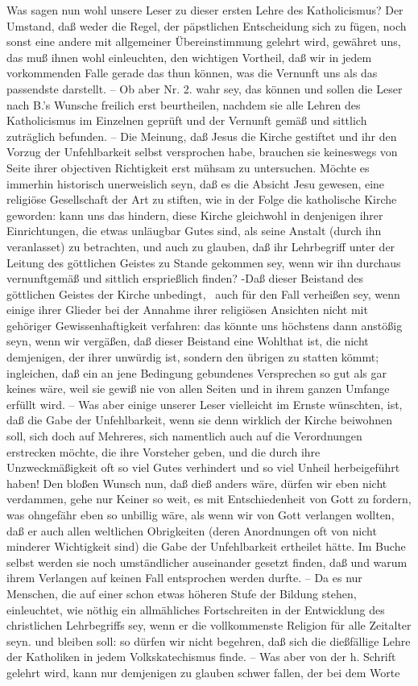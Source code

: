 Was sagen nun wohl unsere Leser zu dieser ersten Lehre des Katholicismus? Der Umstand, daß weder die Regel, der päpstlichen Entscheidung sich zu fügen, noch sonst eine andere mit allgemeiner Übereinstimmung gelehrt wird, gewähret uns, das muß ihnen wohl einleuchten, den wichtigen Vortheil, daß wir in jedem vorkommenden Falle gerade das thun können, was die Vernunft uns als das passendste darstellt. -- Ob aber Nr. 2. wahr sey, das können und sollen die Leser nach B.'s Wunsche freilich erst beurtheilen, nachdem sie alle Lehren des Katholicismus im Einzelnen geprüft und der Vernunft gemäß und sittlich zuträglich befunden. -- Die Meinung, daß Jesus die Kirche gestiftet und ihr den Vorzug der Unfehlbarkeit selbst versprochen habe, brauchen sie keineswegs von Seite ihrer objectiven Richtigkeit erst mühsam zu untersuchen. Möchte es immerhin historisch unerweislich seyn,  daß es die Absicht Jesu gewesen, eine religiöse Gesellschaft der Art zu stiften, wie in der Folge die katholische Kirche geworden: kann uns das hindern, diese Kirche gleichwohl in denjenigen ihrer Einrichtungen, die etwas unläugbar Gutes sind, als seine Anstalt (durch ihn veranlasset) zu betrachten, und auch zu glauben, daß ihr Lehrbegriff unter der Leitung des göttlichen Geistes zu Stande gekommen sey, wenn wir ihn durchaus vernunftgemäß und sittlich ersprießlich finden? -Daß dieser Beistand des göttlichen Geistes der Kirche unbedingt, \dh\  auch für den Fall verheißen sey, wenn einige ihrer Glieder bei der Annahme ihrer religiösen Ansichten nicht mit gehöriger Gewissenhaftigkeit verfahren: das könnte uns höchstens dann anstößig seyn, wenn wir vergäßen, daß dieser Beistand eine Wohlthat ist, die nicht demjenigen, der ihrer unwürdig ist, sondern den übrigen zu statten kömmt; ingleichen, daß ein an jene Bedingung gebundenes Versprechen so gut als gar keines wäre, weil sie gewiß nie von allen Seiten und in ihrem ganzen Umfange erfüllt wird. -- Was aber einige unserer Leser vielleicht im Ernste wünschten, ist, daß die Gabe der Unfehlbarkeit, wenn sie denn wirklich der Kirche beiwohnen soll, sich doch auf Mehreres, sich namentlich auch auf die Verordnungen erstrecken möchte, die ihre Vorsteher geben, und die durch ihre Unzweckmäßigkeit oft so viel Gutes verhindert und so viel Unheil herbeigeführt haben! Den bloßen Wunsch nun, daß dieß anders wäre, dürfen wir eben nicht verdammen, gehe nur Keiner so weit, es mit Entschiedenheit von Gott zu fordern, was ohngefähr eben so unbillig wäre, als wenn wir von Gott verlangen wollten, daß er auch allen weltlichen Obrigkeiten (deren Anordnungen oft von nicht minderer Wichtigkeit sind) die Gabe der Unfehlbarkeit ertheilet hätte. Im Buche selbst werden sie noch umständlicher auseinander gesetzt finden, daß und warum ihrem Verlangen auf keinen Fall entsprochen werden durfte. -- Da es nur Menschen, die auf einer schon etwas höheren Stufe der Bildung stehen, einleuchtet, wie nöthig ein allmähliches Fortschreiten in der Entwicklung des christlichen Lehrbegriffs sey, wenn er die vollkommenste Religion für alle Zeitalter seyn. und bleiben soll: so dürfen wir nicht begehren,  daß sich die dießfällige Lehre der Katholiken in jedem Volkskatechismus finde. -- Was aber von der h. Schrift gelehrt wird, kann nur demjenigen zu glauben schwer fallen, der bei dem Worte 